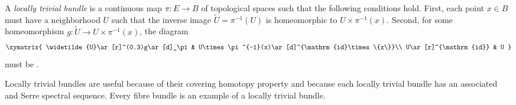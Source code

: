 \documentclass[12pt]{article}
\begin{document}
A {\em locally trivial bundle} is a continuous map
$\pi:E\to B$ of topological spaces such that the following conditions
hold.
First, each point $x\in B$ must have a neighborhood $U$ such that
the inverse image $\widetilde{U}=\pi^{-1}(U)$ is homeomorphic
to $U\times\pi^{-1}(x)$.
Second, for some homeomorphism $g:\widetilde{U}\to U\times\pi^{-1}(x)$,
the diagram
\[\xymatrix{
\widetilde{U}\ar[r]^(0.3)g\ar[d]_\pi
 & U\times\pi^{-1}(x)\ar[d]^{\mathrm{id}\times\{x\}}\\
U\ar[r]^{\mathrm{id}}
 & U
}\]
must be .

Locally trivial bundles are useful because of their covering homotopy property and because each locally trivial bundle has an associated
 and Serre spectral sequence.  Every fibre bundle is an example of a locally trivial bundle.
\end{document}

